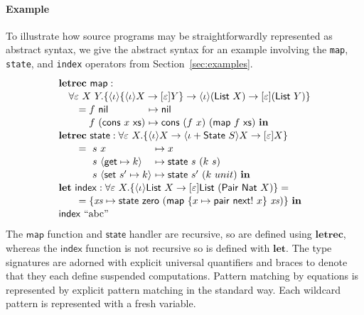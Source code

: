 \documentclass{sigplanconf}
\makeatletter
\newcommand\ba{\begin{array}}
\newcommand\ea{\end{array}}
\newcommand{\bl}{\ba[t]{@{}l@{}}}
\newcommand{\el}{\ea}
\newcommand{\key}[1]{\mathbf{#1}} %
\newcommand{\var}{\mathit}        %
\newcommand{\op}{\mathsf}  %
\newcommand{\con}{\mathsf} %
\newcommand{\inter}{\mathsf} %
\newcommand{\str}[1]{\textrm{``#1''}} %
\newcommand{\thunk}[1]{\{{#1}\}}
\newcommand{\evd}{\varepsilon}
\newcommand{\effin}[1]{\langle {#1} \rangle}
\newcommand{\effout}[1]{[{#1}]}
\newcommand{\id}{\iota}
\makeatother
\begin{document}
\paragraph{Example}
To illustrate how source programs may be straightforwardly represented
as abstract syntax, we give the abstract syntax for an example
involving the \verb!map!, \verb!state!, and \verb!index!  operators
from Section~\ref{sec:examples}.
%
\[
\def\arraystretch{1.1}
\bl
\key{letrec}~\op{map} : \\
\quad
   \forall \evd~X~Y.
      \thunk{\effin{\id}\thunk{\effin{\id}X \to \effout{\evd}Y}
               \to \effin{\id}(\con{List}~X) \to \effout{\evd}(\con{List}~Y)} \\
\qquad =
       \ba[t]{@{}r@{}l@{}l@{}}
                           & f~\con{nil}               &~\mapsto \con{nil} \\
                           & f~(\con{cons}~x~\con{xs}) &~\mapsto \con{cons}~(f~x)~(\op{map}~f~\con{xs}) ~\key{in} \\
       \ea \\
\key{letrec}~\op{state} : \forall \evd~X.\thunk{\effin{\id}X \to \effin{\id + \inter{State}~S}X \to \effout{\evd}X} \\
\qquad =
     \ba[t]{@{}r@{~}l@{~}l@{~}l@{}}
              & s & x &\mapsto x \\
              & s & \effin{\op{get} \mapsto k} &\mapsto \op{state}~s~(k~s) \\
              & s & \effin{\op{set}~s' \mapsto k} &\mapsto \op{state}~s'~(k~unit)~\key{in} \\
     \ea \\
\key{let}~\op{index} : \forall \evd~X.\thunk{\effin{\id}\con{List}~X \to \effout{\evd}\con{List}~(\con{Pair}~\con{Nat}~X)} = \\
\qquad =
    \{                      \var{xs} \mapsto \op{state}~\con{zero}~(\op{map}~\thunk{x \mapsto \op{pair}~\op{next}!~x}~\var{xs})\}~\key{in} \\
\op{index}~\str{abc} \\
\el
\]
%
The $\op{map}$ function and $\op{state}$ handler are recursive, so are
defined using $\key{letrec}$, whereas the $\op{index}$ function is not
recursive so is defined with $\key{let}$. The type signatures are
adorned with explicit universal quantifiers and braces to denote that
they each define suspended computations. Pattern matching by equations
is represented by explicit pattern matching in the standard way. Each
wildcard pattern is represented with a fresh variable.
\end{document}
